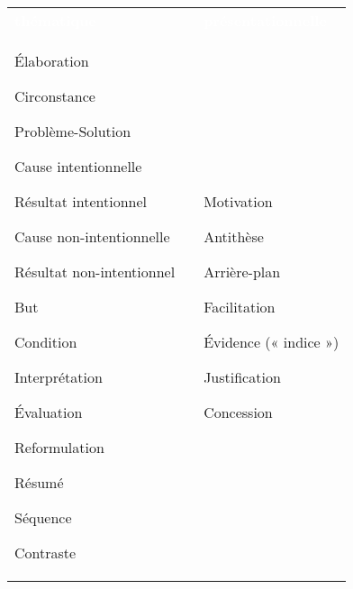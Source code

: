 \documentclass{KodeBook}
\begin{document}
\begin{tabular}{p{}lp{}}
	\rowcolor{darkblue}
	\bfseries\textcolor{white}{thématique} && \bfseries\textcolor{white}{présentationnelle}\\
	
	Élaboration
	
	Circonstance
	
	Problème-Solution
	
	Cause intentionnelle
	
	Résultat intentionnel
	
	Cause non-intentionnelle
	
	Résultat non-intentionnel
	
	But
	
	Condition
	
	Interprétation
	
	Évaluation
	
	Reformulation
	
	Résumé
	
	Séquence
	
	Contraste
	
	&&
	Motivation
	
	Antithèse
	
	Arrière-plan
	
	Facilitation
	
	Évidence (« indice »)
	
	Justification
	
	Concession\\
\end{tabular}
\end{document}
